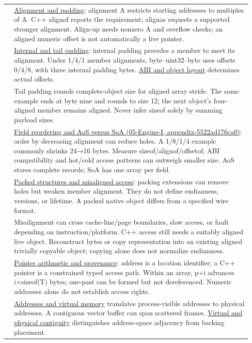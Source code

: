 {\begin{longtable}[]{@{}
  >{\raggedright\arraybackslash}p{}
  >{\raggedright\arraybackslash}p{}@{}}
45 & \hyperref[appendix-a1f7c53b4742]{Alignment and padding}: alignment A restricts starting addresses to multiples of A. C++ alignof reports the requirement; alignas requests a supported stronger alignment. Align-up needs nonzero A and overflow checks; an aligned numeric offset is not automatically a live pointer. \\
46 & \hyperref[appendix-f52f8c5a3afd]{Internal and tail padding}: internal padding precedes a member to meet its alignment. Under 1/4/1 member alignments, byte--uint32--byte uses offsets 0/4/8, with three internal padding bytes. \hyperref[appendix-c4ac6bb0fff8]{ABI and object layout} determines actual offsets. \\
47 & Tail padding rounds complete-object size for aligned array stride. The same example ends at byte nine and rounds to size 12; the next object's four-aligned member remains aligned. Never infer sizeof solely by summing payload sizes. \\
48 & \href{}{Field reordering and AoS versus SoA (05-Engine-I, appendix-5522ad176ca0)}: order by decreasing alignment can reduce holes. A 1/8/1/4 example commonly shrinks 24→16 bytes. Measure sizeof/alignof/offsetof; ABI compatibility and hot/cold access patterns can outweigh smaller size. AoS stores complete records; SoA has one array per field. \\
49 & \hyperref[appendix-0682dbfc5f0e]{Packed structures and misaligned access}: packing extensions can remove holes but weaken member alignment. They do not define endianness, versions, or lifetime. A packed native object differs from a specified wire format. \\
50 & Misalignment can cross cache-line/page boundaries, slow access, or fault depending on instruction/platform. C++ access still needs a suitably aligned live object. Reconstruct bytes or copy representation into an existing aligned trivially copyable object; copying alone does not normalize endianness. \\
51 & \hyperref[appendix-6af5921bc853]{Pointer arithmetic and provenance}: address is a location identifier; a C++ pointer is a constrained typed access path. Within an array, p+i advances i×sizeof(T) bytes; one-past can be formed but not dereferenced. Numeric addresses alone do not establish access rights. \\
52 & \hyperref[appendix-18ee4f913c3c]{Addresses and virtual memory} translates process-visible addresses to physical addresses. A contiguous vector buffer can span scattered frames. \hyperref[appendix-f897c1ddac8f]{Virtual and physical contiguity} distinguishes address-space adjacency from backing placement. \\

\end{longtable}}
